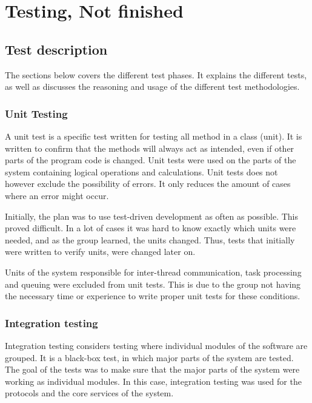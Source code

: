 
\chapter{Testing, Not finished}

\section{Test description}

The sections below covers the different test phases. It explains the different tests, as well as discusses the reasoning and usage of the different test methodologies.

\subsection{Unit Testing}

A unit test is a specific test written for testing all method in a class (unit). It is written to confirm that the methods will always act as intended, even if other parts of the program code is changed. Unit tests were used on the parts of the system containing logical operations and calculations. Unit tests does not however exclude the possibility of errors. It only reduces the amount of cases where an error might occur.

Initially, the plan was to use test-driven development as often as possible. This proved difficult. In a lot of cases it was hard to know exactly which units were needed, and as the group learned, the units changed. Thus, tests that initially were written to verify units, were changed later on.

Units of the system responsible for inter-thread communication, task processing and queuing were excluded from unit tests. This is due to the group not having the necessary time or experience to write proper unit tests for these conditions.

\subsection{Integration testing}

Integration testing considers testing where individual modules of the software are grouped. It is a black-box test, in which major parts of the system are tested. The goal of the tests was to make sure that the major parts of the system were working as individual modules. In this case, integration testing was used for the protocols and the core services of the system.

